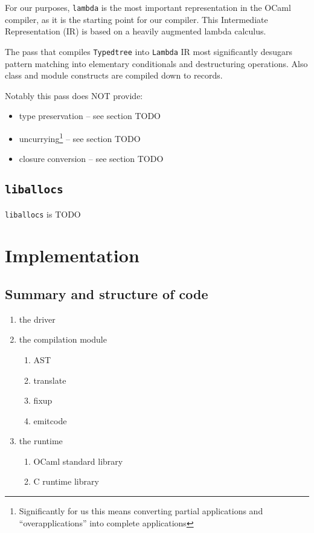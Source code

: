 \documentclass[12pt,a4paper,twoside,openright]{report}
\begin{document}
For our purposes, \lstinline!lambda! is the most important representation in
the OCaml compiler, as it is the starting point for our compiler. This
Intermediate Representation (IR) is based on a heavily augmented lambda calculus.

The pass that compiles \lstinline!Typedtree! into \lstinline!Lambda! IR most
significantly desugars pattern matching into elementary conditionals and
destructuring operations. Also class and module constructs are compiled down to
records.

Notably this pass does NOT provide:

\begin{itemize}
    \item type preservation -- see section TODO
    \item uncurrying\footnote{Significantly for us this means converting
        partial applications and ``overapplications'' into complete applications} -- see section TODO
    \item closure conversion -- see section TODO
\end{itemize}


\section{\texttt{liballocs}}

\lstinline!liballocs! is TODO


\chapter{Implementation}

\section{Summary and structure of code}

\begin{enumerate}
  \item the driver
  \item the compilation module
    \begin{enumerate}
      \item AST
      \item translate
      \item fixup
      \item emitcode
    \end{enumerate}
  \item the runtime
    \begin{enumerate}
      \item OCaml standard library
      \item C runtime library
    \end{enumerate}
\end{enumerate}
\end{document}
